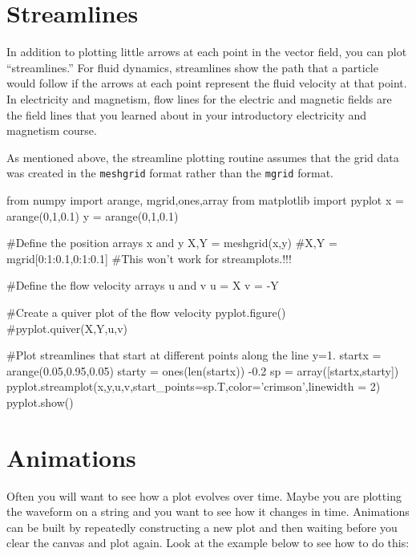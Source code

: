 \section{Streamlines}

In addition to plotting little arrows at each point in the vector field, you
can plot ``streamlines.'' For fluid dynamics, streamlines show the path that
a particle would follow if the arrows at each point represent the fluid
velocity at that point.  In electricity and magnetism, flow lines for the
electric and magnetic fields are the field lines that you learned about in
your introductory electricity and magnetism course.

As mentioned above, the streamline plotting routine assumes that the grid data
was created in the {\tt meshgrid} format rather than the {\tt mgrid} format.

\begin{codeexample}
\begin{VerbatimOut}{\listingFile}
from numpy import arange, mgrid,ones,array
from matplotlib import pyplot
x = arange(0,1,0.1) 
y = arange(0,1,0.1) 

#Define the position arrays x and y
X,Y = meshgrid(x,y)
#X,Y = mgrid[0:1:0.1,0:1:0.1]  #This won't work for streamplots.!!!

#Define the flow velocity arrays u and v
u = X
v = -Y

#Create a quiver plot of the flow velocity
pyplot.figure()
#pyplot.quiver(X,Y,u,v)

#Plot streamlines that start at different points along the line y=1.
startx = arange(0.05,0.95,0.05)
starty = ones(len(startx)) -0.2
sp = array([startx,starty])
pyplot.streamplot(x,y,u,v,start_points=sp.T,color='crimson',linewidth = 2)
pyplot.show()
\end{VerbatimOut}
\end{codeexample}

\section{Animations}
Often you will want to see how a plot evolves over time.  Maybe you
are plotting the waveform on a string and you want to see how it
changes in time.  Animations can be built by repeatedly constructing a
new plot and then waiting before you clear the canvas and plot again.
Look at the example below to see how to do this:


